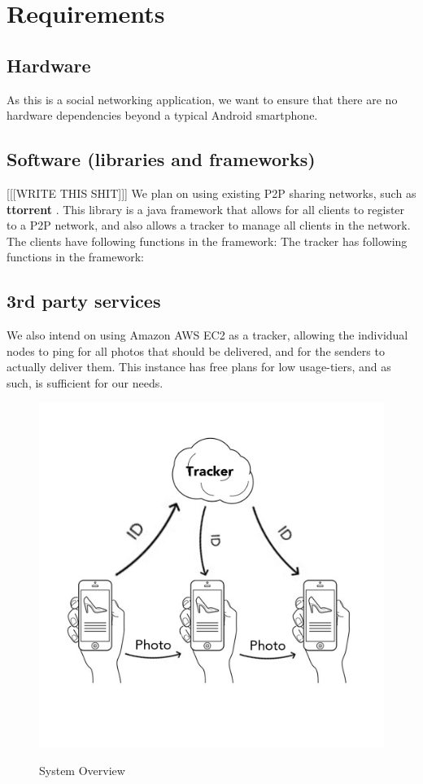 \documentclass{report}
\newcommand{\lfig}[1]{\label{fig:#1}}
\begin{document}
\section{Requirements}

\subsection{Hardware}
As this is a social networking application, we want to ensure that there are no hardware dependencies beyond a typical Android smartphone.

\subsection{Software (libraries and frameworks)}
[[[WRITE THIS SHIT]]]
We plan on using existing P2P sharing networks, such as \textbf{ttorrent} \cite{ttorrentLink}.
This library is a java framework that allows for all clients to register to a P2P network, and also allows a tracker to manage all clients in the network.
The clients have following functions in the framework:
The tracker has following functions in the framework:

\subsection{3rd party services}
We also intend on using Amazon AWS EC2  as a tracker, allowing the individual nodes to ping for all photos that should be delivered, and for the senders to actually deliver them.
This instance has free plans for low usage-tiers, and as such, is sufficient for our needs.

\begin{figure}[h]
	\centering
    \includegraphics[width=\columnwidth]{overview.jpg}
    \lfig{system-overview}
    \vspace{-5mm} %
	\caption{System Overview~\cite{estimote}}
\end{figure}
\end{document}
